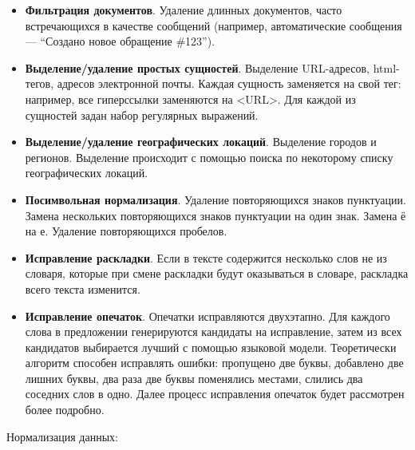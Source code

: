 \begin{itemize}
    \item  \textbf{Фильтрация документов}. Удаление длинных документов, часто встречающихся в качестве сообщений (например, автоматические сообщения — ``Создано новое обращение \#123'').
    \item \textbf{Выделение/удаление простых сущностей}. Выделение URL-адресов, html-тегов, адресов электронной почты. Каждая сущность заменяется на свой тег: например, все гиперссылки заменяются на <URL>. Для каждой из сущностей задан набор регулярных выражений.
\item \textbf{Выделение/удаление географических локаций}. Выделение городов и регионов. Выделение происходит с помощью поиска по некоторому списку географических локаций.
\item \textbf{Посимвольная нормализация}. Удаление повторяющихся знаков пунктуации. Замена нескольких повторяющихся знаков пунктуации на один знак. Замена ё на е. Удаление повторяющихся пробелов.
\item \textbf{Исправление раскладки}. Если в тексте содержится несколько слов не из словаря, которые при смене раскладки будут оказываться в словаре, раскладка всего текста изменится.
\item \textbf{Исправление опечаток}. Опечатки исправляются двухэтапно. Для каждого слова в предложении генерируются кандидаты на исправление, затем из всех кандидатов выбирается лучший с помощью языковой модели. Теоретически алгоритм способен исправлять ошибки: пропущено две буквы, добавлено две лишних буквы, два раза две буквы поменялись местами, слились два соседних слов в одно. Далее процесс исправления опечаток будет рассмотрен более подробно.
\end{itemize}

Нормализация данных:

